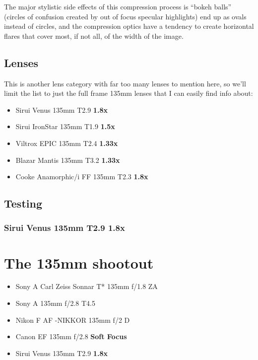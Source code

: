 \documentclass{article}
\begin{document}
The major stylistic side effects of this compression process is ``bokeh balls''
(circles of confusion created by out of focus specular highlights) end up
as ovals instead of circles, and the compression optics have a tendency to
create horizontal flares that cover most, if not all,
of the width of the image.

\subsection{Lenses}

This is another lens category with far too many lenses to mention here,
so we'll limit the list to just the full frame 135mm lenses that I can easily
find info about:

\begin{itemize}
	\item Sirui Venus 135mm T2.9 \textbf{1.8x}
	\item Sirui IronStar 135mm T1.9 \textbf{1.5x}
	\item Viltrox EPIC 135mm T2.4 \textbf{1.33x}
	\item Blazar Mantis 135mm T3.2 \textbf{1.33x}
	\item Cooke Anamorphic/i FF 135mm T2.3 \textbf{1.8x}
\end{itemize}

\subsection{Testing}

\subsubsection{Sirui Venus 135mm T2.9 1.8x}

\section{The 135mm shootout}

\begin{itemize}
	\item Sony A Carl Zeiss Sonnar T* 135mm f/1.8 ZA
	\item Sony A 135mm f/2.8 T4.5 \textbf{}
	\item Nikon F AF \textbf{}-NIKKOR 135mm f/2 D
	\item Canon EF 135mm f/2.8 \textbf{Soft Focus}
	\item Sirui Venus 135mm T2.9 \textbf{1.8x}
\end{itemize}
\end{document}

